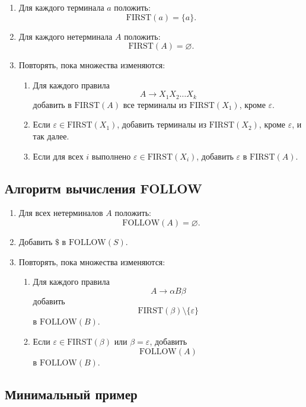 \documentclass[12pt,a4paper]{article}
\begin{document}
\begin{enumerate}
    \item Для каждого терминала $a$ положить:
    \[
    \mathrm{FIRST}(a)=\{a\}.
    \]
    \item Для каждого нетерминала $A$ положить:
    \[
    \mathrm{FIRST}(A)=\varnothing.
    \]
    \item Повторять, пока множества изменяются:
    \begin{enumerate}
        \item Для каждого правила
        \[
        A \to X_1X_2\ldots X_k
        \]
        добавить в $\mathrm{FIRST}(A)$ все терминалы из $\mathrm{FIRST}(X_1)$, кроме $\varepsilon$.
        \item Если $\varepsilon \in \mathrm{FIRST}(X_1)$, добавить терминалы из $\mathrm{FIRST}(X_2)$, кроме $\varepsilon$, и так далее.
        \item Если для всех $i$ выполнено $\varepsilon \in \mathrm{FIRST}(X_i)$, добавить $\varepsilon$ в $\mathrm{FIRST}(A)$.
    \end{enumerate}
\end{enumerate}

\subsection{Алгоритм вычисления FOLLOW}

\begin{enumerate}
    \item Для всех нетерминалов $A$ положить:
    \[
    \mathrm{FOLLOW}(A)=\varnothing.
    \]
    \item Добавить $\$$ в $\mathrm{FOLLOW}(S)$.
    \item Повторять, пока множества изменяются:
    \begin{enumerate}
        \item Для каждого правила
        \[
        A \to \alpha B \beta
        \]
        добавить
        \[
        \mathrm{FIRST}(\beta)\setminus\{\varepsilon\}
        \]
        в $\mathrm{FOLLOW}(B)$.
        \item Если $\varepsilon \in \mathrm{FIRST}(\beta)$ или $\beta=\varepsilon$, добавить
        \[
        \mathrm{FOLLOW}(A)
        \]
        в $\mathrm{FOLLOW}(B)$.
    \end{enumerate}
\end{enumerate}

\subsection{Минимальный пример}
\end{document}
